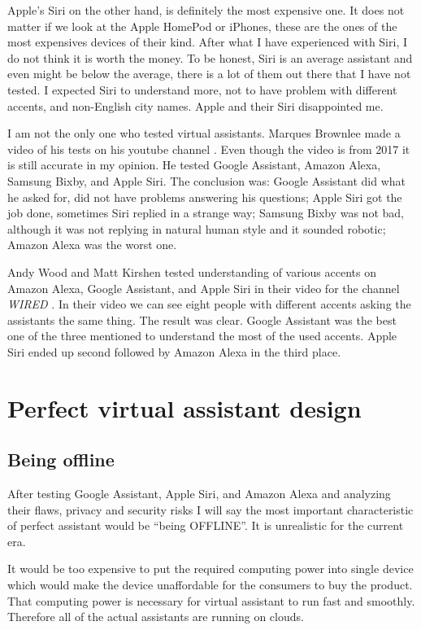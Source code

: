 \documentclass[
  digital, %
  oneside, %
  table,   %
  lof,     %
  lot,     %
]{fithesis3}
\begin{document}
Apple's Siri on the other hand, is definitely the most expensive one. It does not matter if we look at the Apple HomePod or iPhones, these are the ones of the most expensives devices of their kind. After what I have experienced with Siri, I do not think it is worth the money. To be honest, Siri is an average assistant and even might be below the average, there is a lot of them out there that I have not tested. I expected Siri to understand more, not to have problem with different accents, and non-English city names. Apple and their Siri disappointed me.

I am not the only one who tested virtual assistants. Marques Brownlee made a video of his tests on his youtube channel \parencite{brownlee_battle}. Even though the video is from 2017 it is still accurate in my opinion. He tested Google Assistant, Amazon Alexa, Samsung Bixby, and Apple Siri. The conclusion was: Google Assistant did what he asked for, did not have problems answering his questions; Apple Siri got the job done, sometimes Siri replied in a strange way; Samsung Bixby was not bad, although it was not replying in natural human style and it sounded robotic; Amazon Alexa was the worst one.

Andy Wood and Matt Kirshen tested understanding of various accents on Amazon Alexa, Google Assistant, and Apple Siri in their video for the channel \textit{WIRED} \parencite{wired_accents}. In their video we can see eight people with different accents asking the assistants the same thing. The result was clear. Google Assistant was the best one of the three mentioned to understand the most of the used accents. Apple Siri ended up second followed by Amazon Alexa in the third place.

\chapter{Perfect virtual assistant design}

\section{Being offline}
After testing Google Assistant, Apple Siri, and Amazon Alexa and analyzing their flaws, privacy and security risks I will say the most important characteristic of perfect assistant would be ``being OFFLINE''. It is unrealistic for the current era. 

It would be too expensive to put the required computing power into single device which would make the device unaffordable for the consumers to buy the product. That computing power is necessary for virtual assistant to run fast and smoothly. Therefore all of the actual assistants are running on clouds. 
\end{document}
